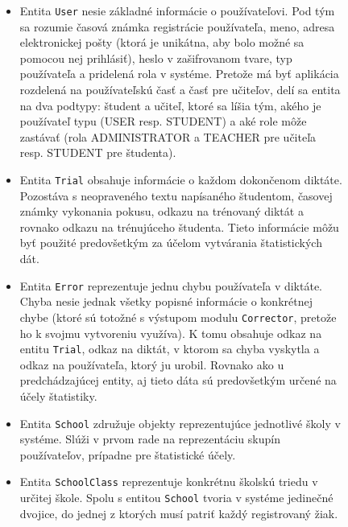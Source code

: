 \documentclass[12pt,oneside]{fithesis2}
\begin{document}
\begin{figure}
\begin{itemize}
	\item Entita \texttt{User} nesie základné informácie o používateľovi. Pod tým sa rozumie časová známka registrácie používateľa, meno, adresa elektronickej pošty (ktorá je unikátna, aby bolo možné sa pomocou nej prihlásiť), heslo v zašifrovanom tvare, typ používateľa a pridelená rola v systéme. Pretože má byť aplikácia rozdelená na používateľskú časť a časť pre učiteľov, delí sa entita na dva podtypy: študent a učiteľ, ktoré sa líšia tým, akého je používateľ typu (USER resp. STUDENT) a aké role môže zastávať (rola ADMINISTRATOR a TEACHER pre učiteľa resp. STUDENT pre študenta). 
	\item Entita \texttt{Trial} obsahuje informácie o každom dokončenom diktáte. Pozostáva s neopraveného textu napísaného študentom, časovej známky vykonania pokusu, odkazu na trénovaný diktát a rovnako odkazu na trénujúceho študenta. Tieto informácie môžu byť použité predovšetkým za účelom vytvárania štatistických dát.
	\item Entita \texttt{Error} reprezentuje jednu chybu používateľa v diktáte. Chyba nesie jednak všetky popisné informácie o konkrétnej chybe (ktoré sú totožné s výstupom modulu \texttt{Corrector}, pretože ho k svojmu vytvoreniu využíva). K tomu obsahuje odkaz na entitu \texttt{Trial}, odkaz na diktát, v ktorom sa chyba vyskytla a odkaz na používateľa, ktorý ju urobil. Rovnako ako u predchádzajúcej entity, aj tieto dáta sú predovšetkým určené na účely štatistiky. 
	\item Entita \texttt{School} združuje objekty reprezentujúce jednotlivé školy v systéme. Slúži v prvom rade na reprezentáciu skupín používateľov, prípadne pre štatistické účely.
	\item Entita \texttt{SchoolClass} reprezentuje konkrétnu školskú triedu v určitej škole. Spolu s entitou \texttt{School} tvoria v systéme jedinečné dvojice, do jednej z ktorých musí patriť každý registrovaný žiak.
		\end{itemize}	
\end{figure}
		
\end{document}
